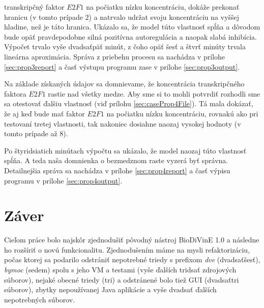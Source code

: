 \documentclass[11pt,final,oneside]{fithesis}
\begin{document}
\begin{itemize}
transkrip\v cn\'y faktor $E2F1$ na po\v ciatku n\'izku koncentr\'aciu, dok\'a\v ze prekona\v t hranicu (v tomto pr\'ipade $2$) a natrvalo udr\v zat svoju 
koncentr\'aciu na vy\v s\v sej hladine, ne\v z je t\'ato hranica. Uk\'azalo sa, \v ze model t\'uto vlastnos\v t sp\'l\v na a d\^ ovodom bude op\"a\v t 
pravdepodobne siln\'a pozit\'ivna autoregul\'acia a naopak slab\'a inhib\'icia. V\'ypo\v cet trvalo vy\v se dvadsa\v tp\"a\v t min\'ut, z \v coho op\"a\v t
\v ses\v t a \v stvr\v t min\'uty trvala line\'arna aproxim\'acia. Spr\'ava z priebehu procesu sa nach\'adza v pr\'ilohe \ref{sec:prop3report} a \v cas\v t
v\'ystupu programu zase v pr\'ilohe \ref{sec:prop3output}.
\end{itemize}

Na z\'aklade z\'iskan\'ych \'udajov sa domnievame, \v ze koncentr\'acia transkrip\v cn\'eho faktora $E2F1$ 
rastie nad v\v setky medze. Aby sme si to mohli potvrdi\v t rozhodli sme sa otestova\v t \v dal\v siu vlastnos\v t (vi\v d pr\'ilohu \ref{sec:caseProp4File}).
T\'a mala dok\'aza\v t, \v ze aj ke\v d bude ma\v t faktor $E2F1$ na po\v ciatku n\'izku koncentr\'aciu, rovnak\'u ako pri testovan\'i tretej vlastnosti,
tak nakoniec dosiahne naozaj vysokej hodnoty (v tomto pr\'ipade a\v z $8$).

Po \v styridsiatich min\'utach v\'ypo\v ctu sa uk\'azalo, \v ze model naozaj t\'uto vlastnos\v t sp\'l\v na. A teda na\v sa domnienka o bezmedznom raste 
vyzer\'a by\v t spr\'avna. Detailnej\v sia spr\'ava sa nach\'adza v pr\'ilohe \ref{sec:prop4report} a \v cas\v t v\'ypisu programu v pr\'ilohe 
\ref{sec:prop4output}.



\chapter{Z\'aver}
Cie\v lom pr\'ace bolo najsk\^ or zjednodu\v si\v t p\^ ovodn\'y n\'astroj BioDiVinE 1.0 a n\'asledne ho roz\v s\'iri\v t o nov\'u funkcionalitu. 
Zjednodu\v sen\'im m\'ame na mysli refaktoriz\'aciu, po\v cas ktorej sa podarilo odstr\'ani\v t nepotrebn\'e triedy s prefixom {\it dve} 
(dvadsa\v t\v ses\v t), {\it bymoc} (sedem) spolu s jeho VM a testami (vy\v se \v dal\v s\'ich tridsa\v t zdrojov\'ych s\'uborov), nejak\'e obecn\'e triedy 
(tri) a odstr\'anen\'e bolo tie\v z GUI (dvadsa\v ttri s\'uborov), zbytky nepou\v z\'ivanej Java aplik\'acie a vy\v se dvadsa\v t \v dal\v s\'ich 
nepotrebn\'ych s\'uborov.
\end{document}

